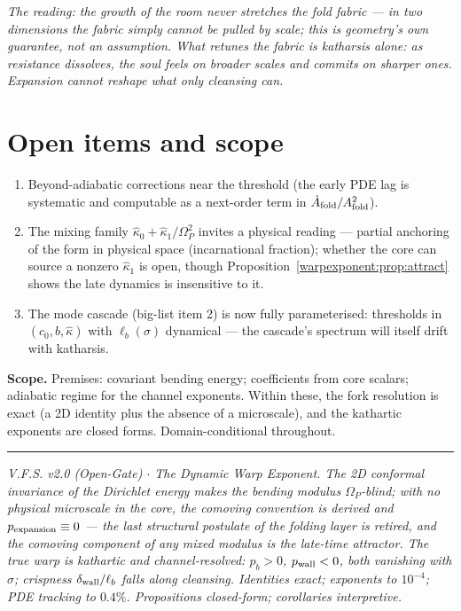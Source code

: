\documentclass[11pt,a4paper,oneside]{book}
\newcommand{\Op}{\Omega_P}
\newcommand{\note}[1]{\textcolor{black!65}{\emph{#1}}}
\newcommand{\Afold}{A_{\rm fold}}
\newcommand{\lb}{\ell_b}
\newcommand{\kw}{\hat\kappa}
\newcommand{\dwall}{\delta_{\rm wall}}
\theoremstyle{plain}
\theoremstyle{definition}
\theoremstyle{remark}
\begin{document}
\note{The reading: the growth of the room never stretches the fold fabric --- in two dimensions the
fabric simply cannot be pulled by scale; this is geometry's own guarantee, not an assumption. What
retunes the fabric is katharsis alone: as resistance dissolves, the soul feels on broader scales and
commits on sharper ones. \emph{Expansion cannot reshape what only cleansing can.}}

\section{Open items and scope}

\begin{enumerate}[leftmargin=1.6em,itemsep=2pt]
\item Beyond-adiabatic corrections near the threshold (the early PDE lag is systematic and computable
as a next-order term in $\dot\Afold/\Afold^2$).
\item The mixing family $\kw_0+\kw_1/\Op^2$ invites a physical reading --- partial anchoring of the
form in physical space (incarnational fraction); whether the core can source a nonzero $\kw_1$ is
open, though Proposition~\ref{warpexponent:prop:attract} shows the late dynamics is insensitive to it.
\item The mode cascade (big-list item 2) is now fully parameterised: thresholds in $(c_0,b,\kw)$ with
$\lb(\sigma)$ dynamical --- the cascade's spectrum will itself drift with katharsis.
\end{enumerate}

\textbf{Scope.} Premises: covariant bending energy; coefficients from core scalars; adiabatic regime
for the channel exponents. Within these, the fork resolution is exact (a 2D identity plus the absence
of a microscale), and the kathartic exponents are closed forms. Domain-conditional throughout.

\vspace{0.5em}
\hrule
\smallskip
\noindent\footnotesize\emph{V.F.S. v2.0 (Open-Gate) $\cdot$ The Dynamic Warp Exponent. The 2D
conformal invariance of the Dirichlet energy makes the bending modulus $\Op$-blind; with no physical
microscale in the core, the comoving convention is derived and $p_{\rm expansion}\equiv0$ --- the last
structural postulate of the folding layer is retired, and the comoving component of any mixed modulus
is the late-time attractor. The true warp is kathartic and channel-resolved: $p_b>0$, $p_{\rm wall}<0$,
both vanishing with $\sigma$; crispness $\dwall/\lb$ falls along cleansing. Identities exact; exponents
to $10^{-4}$; PDE tracking to $0.4\%$. Propositions closed-form; corollaries interpretive.}
\end{document}
